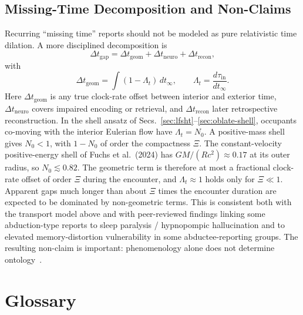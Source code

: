 \documentclass[aps,prd,twocolumn,superscriptaddress,nofootinbib,floatfix]{revtex4-2}
\begin{document}
\subsection{Missing-Time Decomposition and Non-Claims}\label{sec:missing-time}

Recurring ``missing time'' reports should not be modeled as pure relativistic
time dilation. A more disciplined decomposition is
\begin{equation}
\Delta t_{\mathrm{gap}} =
\Delta t_{\mathrm{geom}} +
\Delta t_{\mathrm{neuro}} +
\Delta t_{\mathrm{recon}},
\label{eq:s09-gap}
\end{equation}
with
\begin{equation}
\Delta t_{\mathrm{geom}} = \int (1-\Lambda_t)\,dt_\infty,\qquad
\Lambda_t = \frac{d\tau_{\mathrm{in}}}{dt_\infty}.
\label{eq:s09-lambda}
\end{equation}
Here $\Delta t_{\mathrm{geom}}$ is any true clock-rate offset between interior
and exterior time, $\Delta t_{\mathrm{neuro}}$ covers impaired encoding or
retrieval, and $\Delta t_{\mathrm{recon}}$ later retrospective reconstruction.
In the shell ansatz of Secs.~\ref{sec:lfsht}--\ref{sec:oblate-shell}, occupants
co-moving with the interior Eulerian flow have $\Lambda_t = N_0$. A positive-mass
shell gives $N_0<1$, with $1-N_0$ of order the compactness $\Xi$. The
constant-velocity positive-energy shell of Fuchs et al.~(2024) has
$GM/(Rc^{2})\approx0.17$ at its outer radius, so $N_0\lesssim0.82$. The geometric
term is therefore at most a fractional clock-rate offset of order $\Xi$ during the
encounter, and $\Lambda_t\approx1$ holds only for $\Xi\ll1$. Apparent gaps much
longer than about $\Xi$ times the encounter duration are expected to be dominated
by non-geometric terms. This is consistent both with the transport model above and
with peer-reviewed findings linking some abduction-type reports to sleep paralysis
/ hypnopompic hallucination and to elevated memory-distortion vulnerability in
some abductee-reporting groups. The resulting non-claim is important:
phenomenology alone does not determine
ontology~\cite{NASA_UAP2023,Clancy2002,Cheyne1999,Fuchs2024}.

\appendix

\section{Glossary}\label{app:glossary}
\end{document}
